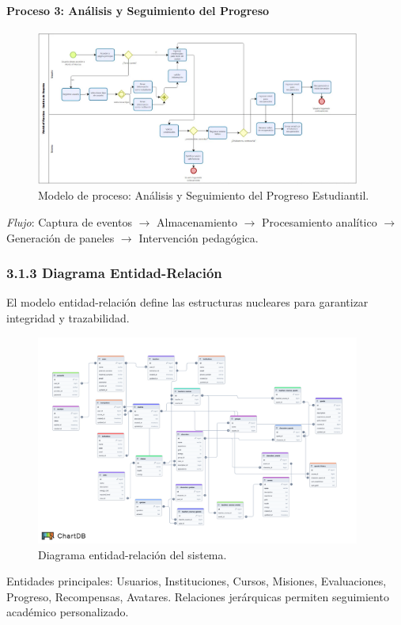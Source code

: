 \paragraph{Proceso 3: Análisis y Seguimiento del Progreso}
\begin{figure}[H]
	\centering
	\includegraphics[width=0.95\textwidth]{images/bizagi_gestion_de_usuarios.png}
	\caption{Modelo de proceso: Análisis y Seguimiento del Progreso Estudiantil.}
	\label{fig:proc-analitica}
\end{figure}
\textit{Flujo}: Captura de eventos $\rightarrow$ Almacenamiento $\rightarrow$ Procesamiento analítico $\rightarrow$ Generación de paneles $\rightarrow$ Intervención pedagógica.

\subsubsection{3.1.3 Diagrama Entidad-Relación}
El modelo entidad-relación define las estructuras nucleares para garantizar integridad y trazabilidad.
\begin{figure}[H]
	\centering
	\includegraphics[width=0.95\textwidth]{images/mer.png}
	\caption{Diagrama entidad-relación del sistema.}
	\label{fig:der}
\end{figure}
Entidades principales: Usuarios, Instituciones, Cursos, Misiones, Evaluaciones, Progreso, Recompensas, Avatares. Relaciones jerárquicas permiten seguimiento académico personalizado.

